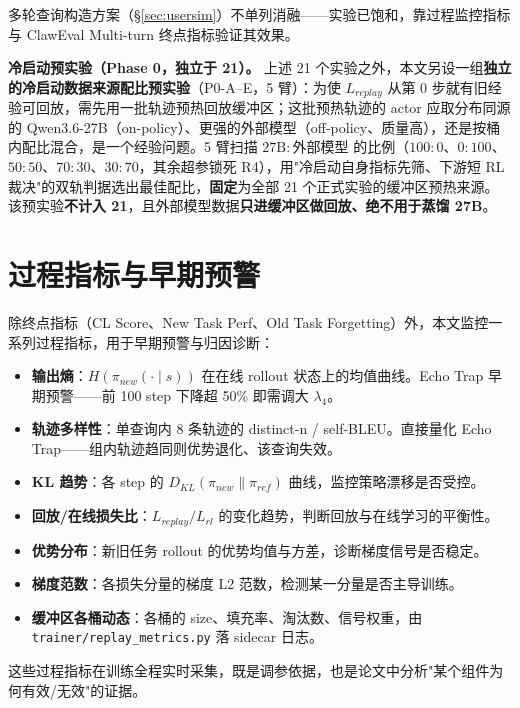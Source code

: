 多轮查询构造方案（\S\ref{sec:usersim}）不单列消融——实验已饱和，靠过程监控指标与 ClawEval Multi-turn 终点指标验证其效果。

\textbf{冷启动预实验（Phase 0，独立于 21）。} 上述 21 个实验之外，本文另设一组\textbf{独立的冷启动数据来源配比预实验}（P0-A--E，5 臂）：为使 $L_{replay}$ 从第 0 步就有旧经验可回放，需先用一批轨迹预热回放缓冲区；这批预热轨迹的 actor 应取分布同源的 Qwen3.6-27B（on-policy）、更强的外部模型（off-policy、质量高），还是按桶内配比混合，是一个经验问题。5 臂扫描 $27\mathrm{B}{:}\text{外部模型}$ 的比例（$100{:}0$、$0{:}100$、$50{:}50$、$70{:}30$、$30{:}70$，其余超参锁死 R4），用"冷启动自身指标先筛、下游短 RL 裁决"的双轨判据选出最佳配比，\textbf{固定}为全部 21 个正式实验的缓冲区预热来源。该预实验\textbf{不计入 21}，且外部模型数据\textbf{只进缓冲区做回放、绝不用于蒸馏 27B}。

\section{过程指标与早期预警}
\label{sec:exp-metrics}

除终点指标（CL Score、New Task Perf、Old Task Forgetting）外，本文监控一系列过程指标，用于早期预警与归因诊断：

\begin{itemize}
  \item \textbf{输出熵}：$H(\pi_{new}(\cdot\mid s))$ 在在线 rollout 状态上的均值曲线。Echo Trap 早期预警——前 100 step 下降超 50\% 即需调大 $\lambda_4$。
  \item \textbf{轨迹多样性}：单查询内 8 条轨迹的 distinct-n / self-BLEU。直接量化 Echo Trap——组内轨迹趋同则优势退化、该查询失效。
  \item \textbf{KL 趋势}：各 step 的 $D_{KL}(\pi_{new}\|\pi_{ref})$ 曲线，监控策略漂移是否受控。
  \item \textbf{回放/在线损失比}：$L_{replay}/L_{rl}$ 的变化趋势，判断回放与在线学习的平衡性。
  \item \textbf{优势分布}：新旧任务 rollout 的优势均值与方差，诊断梯度信号是否稳定。
  \item \textbf{梯度范数}：各损失分量的梯度 L2 范数，检测某一分量是否主导训练。
  \item \textbf{缓冲区各桶动态}：各桶的 size、填充率、淘汰数、信号权重，由 \texttt{trainer/replay\_metrics.py} 落 sidecar 日志。
\end{itemize}

这些过程指标在训练全程实时采集，既是调参依据，也是论文中分析"某个组件为何有效/无效"的证据。

